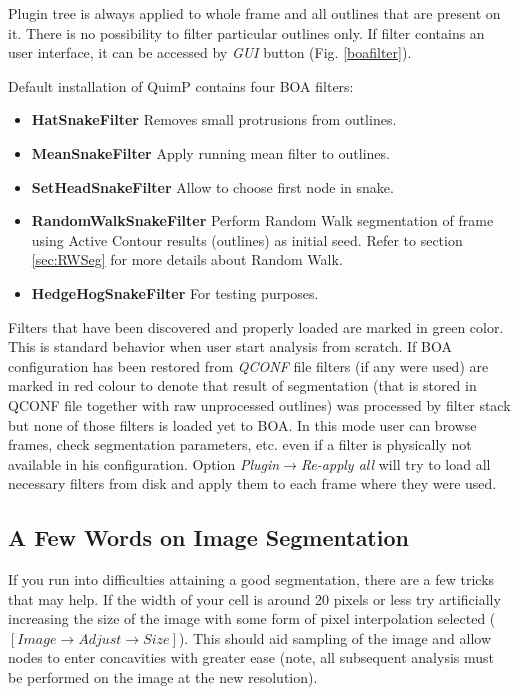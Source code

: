 \documentclass[a4paper,12pt]{article}
\begin{document}
Plugin tree is always applied to whole frame and all outlines that are present on it. There is no possibility to filter particular outlines only. If filter contains an user interface, it can be accessed by \textit{GUI} button (Fig. \ref{boafilter}).

Default installation of QuimP contains four BOA filters:
\begin{itemize}
	\item \textbf{HatSnakeFilter} Removes small protrusions from outlines.
	\item \textbf{MeanSnakeFilter} Apply running mean filter to outlines.
	\item \textbf{SetHeadSnakeFilter} Allow to choose first node in snake.
	\item \textbf{RandomWalkSnakeFilter} Perform Random Walk segmentation of frame using Active Contour results (outlines) as initial seed. Refer to section \ref{sec:RWSeg} for more details about Random Walk.
	\item \textbf{HedgeHogSnakeFilter} For testing purposes.
\end{itemize}

Filters that have been discovered and properly loaded are marked in green color. This is standard behavior when user start analysis from scratch. If BOA configuration has been restored from \textit{QCONF} file filters (if any were used) are marked in red colour to denote that result of segmentation (that is stored in QCONF file together with raw unprocessed outlines) was processed by filter stack but none of those filters is loaded yet to BOA. In this mode user can browse frames, check segmentation parameters, etc. even if a filter is physically not available in his configuration. Option \textit{Plugin}$\rightarrow$\textit{Re-apply all} will try to load all necessary filters from disk and apply them to each frame where they were used.  

\subsection{A Few Words on Image Segmentation}

If you run into difficulties attaining a good segmentation, there are a few tricks that may help.  If the width of your cell is around 20 pixels or less
try artificially increasing the size of the image with some form of pixel interpolation selected ($[Image \rightarrow Adjust \rightarrow Size]$).
This should aid sampling of the image and allow nodes to enter concavities with greater ease (note, all subsequent analysis
must be performed on the image at the new resolution).
\end{document}
